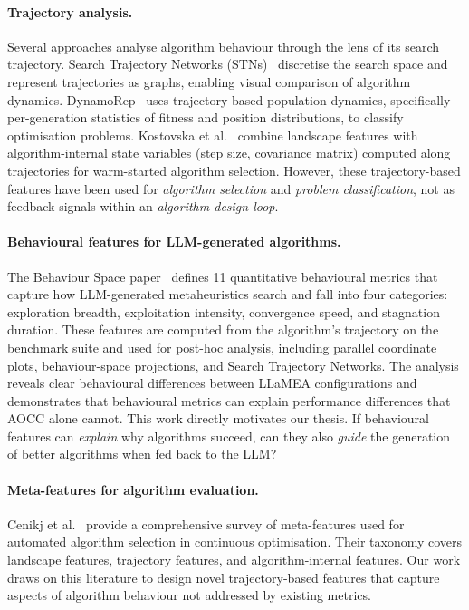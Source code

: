 \paragraph{Trajectory analysis.}
Several approaches analyse algorithm behaviour through the lens of its search trajectory. Search Trajectory Networks (STNs)~\cite{ochoa2021stn} discretise the search space and represent trajectories as graphs, enabling visual comparison of algorithm dynamics. DynamoRep~\cite{cenikj2023dynamorep} uses trajectory-based population dynamics, specifically per-generation statistics of fitness and position distributions, to classify optimisation problems. Kostovska et al.~\cite{kostovska2022trajectory} combine landscape features with algorithm-internal state variables (step size, covariance matrix) computed along trajectories for warm-started algorithm selection. However, these trajectory-based features have been used for \emph{algorithm selection} and \emph{problem classification}, not as feedback signals within an \emph{algorithm design loop}.

\paragraph{Behavioural features for LLM-generated algorithms.}
The Behaviour Space paper~\cite{vanStein2025Behaviour} defines 11 quantitative behavioural metrics that capture how LLM-generated metaheuristics search and fall into four categories: exploration breadth, exploitation intensity, convergence speed, and stagnation duration. These features are computed from the algorithm's trajectory on the benchmark suite and used for post-hoc analysis, including parallel coordinate plots, behaviour-space projections, and Search Trajectory Networks. The analysis reveals clear behavioural differences between LLaMEA configurations and demonstrates that behavioural metrics can explain performance differences that AOCC alone cannot. This work directly motivates our thesis. If behavioural features can \emph{explain} why algorithms succeed, can they also \emph{guide} the generation of better algorithms when fed back to the LLM?

\paragraph{Meta-features for algorithm evaluation.}
Cenikj et al.~\cite{cenikj2026features} provide a comprehensive survey of meta-features used for automated algorithm selection in continuous optimisation. Their taxonomy covers landscape features, trajectory features, and algorithm-internal features. Our work draws on this literature to design novel trajectory-based features that capture aspects of algorithm behaviour not addressed by existing metrics.

